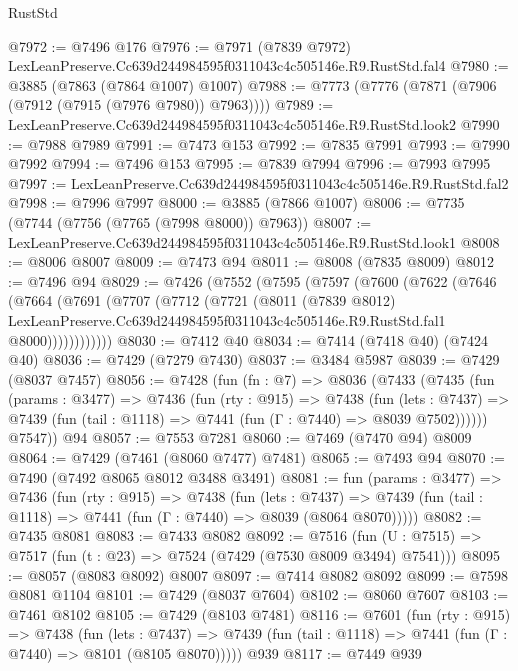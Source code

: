 \begin{lexlean}{RustStd}
\begin{coremodule}
@7972 := @7496 @176
@7976 := @7971 (@7839 @7972) LexLeanPreserve.Cc639d244984595f0311043c4c505146e.R9.RustStd.fal4
@7980 := @3885 (@7863 (@7864 @1007) @1007)
@7988 := @7773 (@7776 (@7871 (@7906 (@7912 (@7915 (@7976 @7980)) @7963))))
@7989 := LexLeanPreserve.Cc639d244984595f0311043c4c505146e.R9.RustStd.look2
@7990 := @7988 @7989
@7991 := @7473 @153
@7992 := @7835 @7991
@7993 := @7990 @7992
@7994 := @7496 @153
@7995 := @7839 @7994
@7996 := @7993 @7995
@7997 := LexLeanPreserve.Cc639d244984595f0311043c4c505146e.R9.RustStd.fal2
@7998 := @7996 @7997
@8000 := @3885 (@7866 @1007)
@8006 := @7735 (@7744 (@7756 (@7765 (@7998 @8000)) @7963))
@8007 := LexLeanPreserve.Cc639d244984595f0311043c4c505146e.R9.RustStd.look1
@8008 := @8006 @8007
@8009 := @7473 @94
@8011 := @8008 (@7835 @8009)
@8012 := @7496 @94
@8029 := @7426
    (@7552
      (@7595
        (@7597
          (@7600
            (@7622
              (@7646
                (@7664
                  (@7691
                    (@7707
                      (@7712
                        (@7721
                          (@8011
                            (@7839 @8012)
                            LexLeanPreserve.Cc639d244984595f0311043c4c505146e.R9.RustStd.fal1
                            @8000))))))))))))
@8030 := @7412 @40
@8034 := @7414 (@7418 @40) (@7424 @40)
@8036 := @7429 (@7279 @7430)
@8037 := @3484 @5987
@8039 := @7429 (@8037 @7457)
@8056 := @7428
    (fun (fn : @7) =>
    @8036
      (@7433
        (@7435
          (fun (params : @3477) =>
          @7436
            (fun (rty : @915) =>
            @7438
              (fun (lets : @7437) =>
              @7439 (fun (tail : @1118) => @7441 (fun (Γ : @7440) => @8039 @7502))))))
        @7547))
    @94
@8057 := @7553 @7281
@8060 := @7469 (@7470 @94) @8009
@8064 := @7429 (@7461 (@8060 @7477) @7481)
@8065 := @7493 @94
@8070 := @7490 (@7492 @8065 @8012 @3488 @3491)
@8081 := fun (params : @3477) =>
  @7436
    (fun (rty : @915) =>
    @7438
      (fun (lets : @7437) =>
      @7439 (fun (tail : @1118) => @7441 (fun (Γ : @7440) => @8039 (@8064 @8070)))))
@8082 := @7435 @8081
@8083 := @7433 @8082
@8092 := @7516 (fun (U : @7515) => @7517 (fun (t : @23) => @7524 (@7429 (@7530 @8009 @3494) @7541)))
@8095 := @8057 (@8083 @8092) @8007
@8097 := @7414 @8082 @8092
@8099 := @7598 @8081 @1104
@8101 := @7429 (@8037 @7604)
@8102 := @8060 @7607
@8103 := @7461 @8102
@8105 := @7429 (@8103 @7481)
@8116 := @7601
    (fun (rty : @915) =>
    @7438
      (fun (lets : @7437) =>
      @7439 (fun (tail : @1118) => @7441 (fun (Γ : @7440) => @8101 (@8105 @8070)))))
    @939
@8117 := @7449 @939

\end{coremodule}
\end{lexlean}
